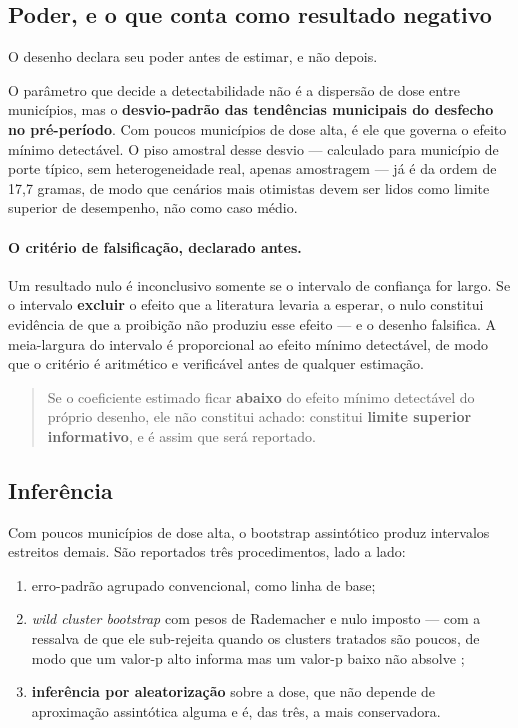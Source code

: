 \subsection{Poder, e o que conta como resultado negativo}
\label{sub:poder}

O desenho declara seu poder antes de estimar, e não depois.

O parâmetro que decide a detectabilidade não é a dispersão de dose entre
municípios, mas o \textbf{desvio-padrão das tendências municipais do desfecho no
pré-período}. Com poucos municípios de dose alta, é ele que governa o efeito
mínimo detectável. O piso amostral desse desvio --- calculado para município de
porte típico, sem heterogeneidade real, apenas amostragem --- já é da ordem de
17,7 gramas, de modo que cenários mais otimistas devem ser lidos como limite
superior de desempenho, não como caso médio.

\paragraph{O critério de falsificação, declarado antes.} Um resultado nulo é
inconclusivo somente se o intervalo de confiança for largo. Se o intervalo
\textbf{excluir} o efeito que a literatura levaria a esperar, o nulo constitui
evidência de que a proibição não produziu esse efeito --- e o desenho falsifica.
A meia-largura do intervalo é proporcional ao efeito mínimo detectável, de modo
que o critério é aritmético e verificável antes de qualquer estimação.

\begin{quote}
Se o coeficiente estimado ficar \textbf{abaixo} do efeito mínimo detectável do
próprio desenho, ele não constitui achado: constitui \textbf{limite superior
informativo}, e é assim que será reportado.
\end{quote}

\subsection{Inferência}
\label{sub:inferencia}

Com poucos municípios de dose alta, o bootstrap assintótico produz intervalos
estreitos demais. São reportados três procedimentos, lado a lado:

\begin{enumerate}
  \item erro-padrão agrupado convencional, como linha de base;
  \item \emph{wild cluster bootstrap} com pesos de Rademacher e nulo imposto
    \citep{cameron2008wild} --- com a ressalva de que ele sub-rejeita quando os
    clusters tratados são poucos, de modo que um valor-p alto informa mas um
    valor-p baixo não absolve \citep{canay2021wild};
  \item \textbf{inferência por aleatorização} sobre a dose, que não depende de
    aproximação assintótica alguma e é, das três, a mais conservadora.
\end{enumerate}

